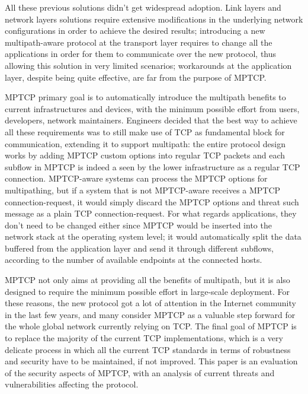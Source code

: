 \vspace{5mm}
All these previous solutions didn't get widespread adoption. Link layers and network layers solutions require extensive modifications in the underlying network configurations in order to achieve the desired results; introducing a new multipath-aware protocol at the transport layer requires to change all the applications in order for them to communicate over the new protocol, thus allowing this solution in very limited scenarios; workarounds at the application layer, despite being quite effective, are far from the purpose of MPTCP.


MPTCP primary goal is to automatically introduce the multipath benefits to current infrastructures and devices, with the minimum possible effort from users, developers, network maintainers. Engineers decided that the best way to achieve all these requirements was to still make use of TCP as fundamental block for communication, extending it to support multipath: the entire protocol design works by adding MPTCP custom options into regular TCP packets and each subflow in MPTCP is indeed a seen by the lower infrastructure as a regular TCP connection. MPTCP-aware systems can process the MPTCP options for multipathing, but if a system that is not MPTCP-aware receives a MPTCP connection-request, it would simply discard the MPTCP options and threat such message as a plain TCP connection-request. 
For what regards applications, they don't need to be changed either since MPTCP would be inserted into the network stack at the operating system level; it would automatically split the data buffered from the application layer and send it through different subflows, according to the number of available endpoints at the connected hosts.

\vspace{5mm}
MPTCP not only aims at providing all the benefits of multipath, but it is also designed to require the minimum possible effort in large-scale deployment. For these reasons, the new protocol got a lot of attention in the Internet community in the last few years, and many consider MPTCP as a valuable step forward for the whole global network currently relying on TCP.
The final goal of MPTCP is to replace the majority of the current TCP implementations, which is a very delicate process in which all the current TCP standards in terms of robustness and security have to be maintained, if not improved. This paper is an evaluation of the security aspects of MPTCP, with an analysis of current threats and vulnerabilities affecting the protocol.

